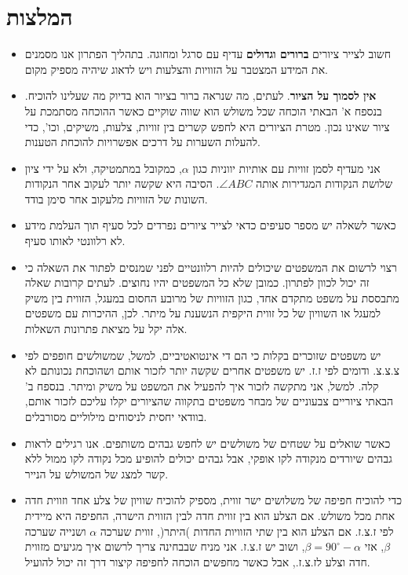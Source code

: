 \documentclass[12pt,a4paper]{article}
\newcommand*{\np}{\selectlanguage{english}\newpage\selectlanguage{hebrew}}
\begin{document}


\np

\section{המלצות}

\begin{itemize}
\item
חשוב לצייר ציורים 
\textbf{ברורים וגדולים}
עדיף עם סרגל ומחוגה. בתהליך הפתרון אנו מסמנים את המידע המצטבר על הזוויות והצלעות ויש לדאוג שיהיה מספיק מקום.

\item
\textbf{אין לסמוך על הציור}.
לעתים, מה שנראה ברור בציור הוא בדיוק מה שעלינו להוכיח. בנספח א' הבאתי הוכחה שכל משולש הוא שווה שוקיים כאשר ההוכחה מסתמכת על ציור שאינו נכון. מטרת הציורים היא לחפש קשרים בין זוויות, צלעות, משיקים, וכו', כדי להעלות השערות על דרכים אפשרויות להוכחת הטענות.

\item
אני מעדיף לסמן זוויות עם אותיות יווניות כגון
$\alpha$,
כמקובל במתמטיקה, ולא על ידי ציון שלושת הנקודות המגדירות אותה
$\angle ABC$.
הסיבה היא שקשה יותר לעקוב אחר הנקודות השונות של הזוויות מלעקוב אחר סימן בודד.

\item
כאשר לשאלה יש מספר סעיפים כדאי לצייר ציורים נפרדים לכל סעיף תוך העלמת מידע לא רלוונטי לאותו סעיף.

\item
רצוי לרשום את המשפטים שיכולים להיות רלוונטיים לפני שמנסים לפתור את השאלה כי זה יכול לכוון לפתרון. כמובן שלא כל המשפטים יהיו נחוצים. לעתים קרובות שאלה מתבססת על משפט מתקדם אחד, כגון הזוויות של מרובע החסום במעגל, הזווית בין משיק למעגל או השוויון של כל זווית היקפית הנשענת על מיתר. לכן, ההיכרות עם משפטים אלה יקל על מציאת פתרונות השאלות.

\item
יש משפטים שזוכרים בקלות כי הם די אינטואטיביים, למשל, שמשולשים חופפים לפי צ.צ.צ. ודומים לפי ז.ז. יש משפטים אחרים שקשה יותר לזכור אותם ושהוכחת נכונותם לא קלה. למשל, אני מתקשה לזכור איך להפעיל את המשפט על משיק ומיתר. בנספח ב' הבאתי ציוריים צבעוניים של מבחר משפטים בתקווה שהציורים יקלו עליכם לזכור אותם, בוודאי יחסית לניסוחים מילוליים מסורבלים.

\item
כאשר שואלים על שטחים של משולשים יש לחפש גבהים משותפים. אנו רגילים לראות גבהים שיורדים מנקודה לקו אופקי, אבל גבהים יכולים להופיע מכל נקודה לקו ממול ללא קשר למצג של המשולש על הנייר.

\item
כדי להוכיח חפיפה של משלושים ישר זווית, מספיק להוכיח שוויון של צלע אחד וזווית חדה אחת מכל משולש. אם הצלע הוא בין זווית חדה לבין הזווית הישרה, החפיפה היא מיידית לפי ז.צ.ז. אם הצלע הוא בין שתי הזוויות החדות )היתר(, זווית שערכה 
$\alpha$
ושנייה שערכה
$\beta$,
אזי
$\beta=90^\circ-\alpha$,
ושוב יש ז.צ.ז. אני מניח שבבחינה צריך לרשום איך מגיעים מזווית חדה וצלע לז.צ.ז., אבל כאשר מחפשים הוכחה לחפיפה קיצור דרך זה יכול להועיל.

\end{itemize}
\end{document}
